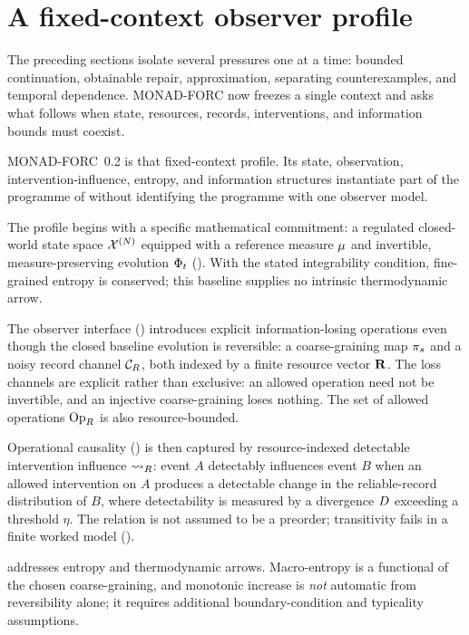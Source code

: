 \section{A fixed-context observer profile}\label{sec:introduction}

The preceding sections isolate several pressures one at a time:
bounded continuation, obtainable repair, approximation, separating
counterexamples, and temporal dependence. MONAD-FORC now freezes a
single context and asks what follows when state, resources, records,
interventions, and information bounds must coexist.

MONAD-FORC~0.2 is that fixed-context profile. Its state, observation,
intervention-influence, entropy, and information structures
instantiate part of the programme of 
without identifying the programme with one observer model.

The profile begins with a specific mathematical commitment: a regulated closed-world state space
$\mathcal{X}^{(N)}$ equipped with a reference measure $\mu$ and invertible,
measure-preserving evolution $\Phi_t$
(). With the stated integrability condition,
fine-grained entropy is conserved; this baseline supplies no intrinsic
thermodynamic arrow.

The observer interface () introduces explicit
information-losing operations even though the closed baseline evolution
is reversible: a coarse-graining map
$\pi_s$ and a noisy record channel $\mathcal{C}_R$, both indexed by a
finite resource vector $\mathbf{R}$.  The loss channels are explicit
rather than exclusive: an allowed operation need not be invertible, and
an injective coarse-graining loses nothing.  The set of allowed operations
$\mathrm{Op}_{R}$ is also resource-bounded.

Operational causality () is then
captured by resource-indexed detectable intervention influence
$\rightsquigarrow_{R}$: event $A$ detectably influences event $B$ when an
allowed intervention on $A$ produces a detectable change in the
reliable-record distribution of $B$, where detectability is measured by
a divergence $D$ exceeding a threshold $\eta$.  The
relation is not assumed to be a preorder; transitivity fails in a
finite worked model ().

 addresses entropy and thermodynamic arrows.
Macro-entropy is a functional of the chosen coarse-graining, and monotonic
increase is \emph{not} automatic from reversibility alone; it requires
additional boundary-condition and typicality assumptions.

